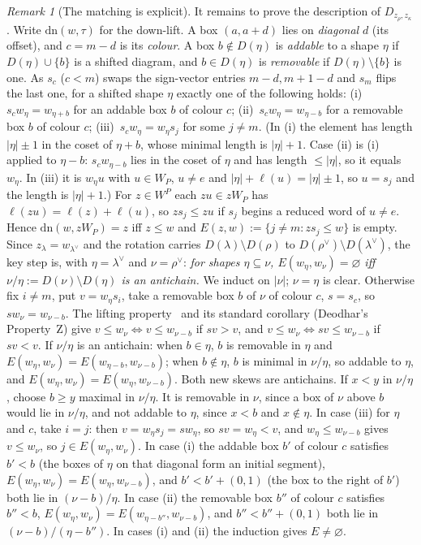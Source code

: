 \documentclass[11pt]{amsart}
\theoremstyle{definition}
\theoremstyle{remark}
\newtheorem{remark}[theorem]{Remark}
\begin{document}
\begin{remark}[The matching is explicit]
It remains to prove the description of $D_{z_\rho,z_\kappa}$. Write $\mathrm{dn}(w,\tau)$ for the down-lift. A box $(a,a+d)$ lies on
\emph{diagonal} $d$ (its offset), and $c=m-d$ is its \emph{colour}. A box $b\notin D(\eta)$ is \emph{addable} to a shape
$\eta$ if $D(\eta)\cup\{b\}$ is a shifted diagram, and $b\in D(\eta)$ is \emph{removable} if $D(\eta)\setminus\{b\}$ is one. As $s_c$ ($c<m$) swaps the sign-vector entries $m-d,m+1-d$ and $s_m$ flips the last
one, for a shifted shape $\eta$ exactly one of the following holds: (i)~$s_cw_\eta=w_{\eta+b}$ for an addable box $b$ of
colour $c$; (ii)~$s_cw_\eta=w_{\eta-b}$ for a removable box $b$ of colour $c$; (iii)~$s_cw_\eta=w_\eta s_j$ for some $j\ne m$.
(In (i) the element has length $|\eta|\pm1$ in the coset of $\eta+b$, whose minimal length is $|\eta|+1$. Case (ii) is (i)
applied to $\eta-b$: $s_cw_{\eta-b}$ lies in the coset of $\eta$ and has length $\le|\eta|$, so it equals $w_\eta$. In (iii) it is $w_\eta u$ with $u\in W_P$,
$u\ne e$ and $|\eta|+\ell(u)=|\eta|\pm1$, so $u=s_j$ and the length is $|\eta|+1$.)
For $z\in W^P$ each $zu\in zW_P$ has $\ell(zu)=\ell(z)+\ell(u)$, so $zs_j\le zu$ if $s_j$ begins a reduced word of $u\ne e$.
Hence $\mathrm{dn}(w,zW_P)=z$ iff $z\le w$ and $E(z,w):=\{j\ne m:zs_j\le w\}$ is empty. Since $z_\lambda=w_{\lambda^\vee}$ and the rotation carries $D(\lambda)\setminus D(\rho)$ to
$D(\rho^\vee)\setminus D(\lambda^\vee)$, the key step is, with $\eta=\lambda^\vee$ and $\nu=\rho^\vee$: \emph{for shapes $\eta\subseteq\nu$, $E(w_\eta,w_\nu)=\varnothing$ iff $\nu/\eta:=D(\nu)\setminus D(\eta)$ is an
antichain.} We induct on $|\nu|$; $\nu=\eta$ is clear. Otherwise fix $i\ne m$, put $v=w_\eta s_i$, take a removable box $b$ of $\nu$
of colour $c$, $s=s_c$, so $sw_\nu=w_{\nu-b}$. The lifting property~\cite[Prop.~2.2.7]{BB05} and its standard corollary (Deodhar's Property~Z) give $v\le w_\nu\iff v\le
w_{\nu-b}$ if $sv>v$, and $v\le w_\nu\iff sv\le w_{\nu-b}$ if $sv<v$. If $\nu/\eta$ is an antichain: when $b\in\eta$, $b$ is
removable in $\eta$ and $E(w_\eta,w_\nu)=E(w_{\eta-b},w_{\nu-b})$; when $b\notin\eta$, $b$ is minimal in $\nu/\eta$, so
addable to $\eta$, and $E(w_\eta,w_\nu)=E(w_\eta,w_{\nu-b})$. Both new skews are antichains. If $x<y$ in $\nu/\eta$, choose
$b\ge y$ maximal in $\nu/\eta$. It is removable in $\nu$, since a box of $\nu$ above $b$ would lie in $\nu/\eta$, and not
addable to $\eta$, since $x<b$ and $x\notin\eta$. In case (iii) for $\eta$ and $c$, take $i=j$: then $v=w_\eta s_j=sw_\eta$,
so $sv=w_\eta<v$, and $w_\eta\le w_{\nu-b}$ gives $v\le w_\nu$, so $j\in E(w_\eta,w_\nu)$. In case (i) the addable box $b'$ of colour
$c$ satisfies $b'<b$ (the boxes of $\eta$ on that diagonal form an initial segment), $E(w_\eta,w_\nu)=E(w_\eta,w_{\nu-b})$,
and $b'<b'+(0,1)$ (the box to the right of $b'$) both lie in $(\nu-b)/\eta$. In case (ii) the removable box $b''$ of colour $c$ satisfies $b''<b$,
$E(w_\eta,w_\nu)=E(w_{\eta-b''},w_{\nu-b})$, and $b''<b''+(0,1)$ both lie in $(\nu-b)/(\eta-b'')$. In cases (i)
and (ii) the induction gives $E\ne\varnothing$.


\end{remark}
\end{document}
